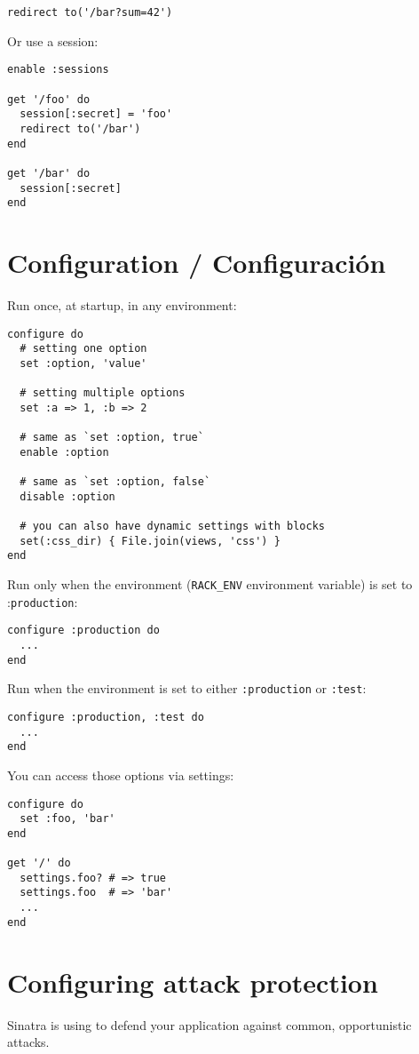 \begin{verbatim}
redirect to('/bar?sum=42')
\end{verbatim}
Or use a session:

\begin{verbatim}
enable :sessions

get '/foo' do
  session[:secret] = 'foo'
  redirect to('/bar')
end

get '/bar' do
  session[:secret]
end
\end{verbatim}

\section{Configuration / Configuración}
Run once, at startup, in any environment:

\begin{verbatim}
configure do
  # setting one option
  set :option, 'value'

  # setting multiple options
  set :a => 1, :b => 2

  # same as `set :option, true`
  enable :option

  # same as `set :option, false`
  disable :option

  # you can also have dynamic settings with blocks
  set(:css_dir) { File.join(views, 'css') }
end
\end{verbatim}
Run only when the environment (\verb|RACK_ENV|
 environment variable) is set to :\verb|production|:

\begin{verbatim}
configure :production do
  ...
end
\end{verbatim}
Run when the environment is set to either \verb|:production| or \verb|:test|:

\begin{verbatim}
configure :production, :test do
  ...
end
\end{verbatim}
You can access those options via settings:

\begin{verbatim}
configure do
  set :foo, 'bar'
end

get '/' do
  settings.foo? # => true
  settings.foo  # => 'bar'
  ...
end
\end{verbatim}

\section{Configuring attack protection}
Sinatra is using \rackprotection{}
to defend your application against common, opportunistic attacks.

